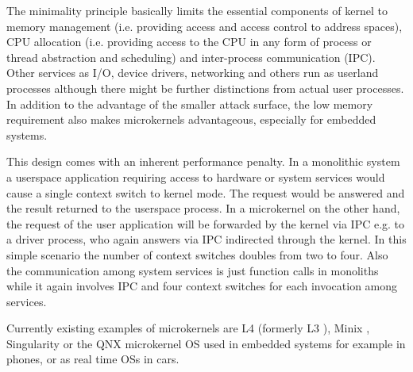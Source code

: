 The minimality principle basically limits the essential components of kernel to memory management (i.e. providing access and access control to address spaces), CPU allocation (i.e. providing access to the CPU in any form of process or thread abstraction and scheduling) and inter-process communication (IPC). Other services as I/O, device drivers, networking and others run as userland processes although there might be further distinctions from actual user processes. In addition to the advantage of the smaller attack surface, the low memory requirement also makes microkernels advantageous, especially for embedded systems. 

This design comes with an inherent performance penalty. In a monolithic system a userspace application requiring access to hardware or system services would cause a single context switch to kernel mode. The request would be answered and the result returned to the userspace process. In a microkernel on the other hand, the request of the user application will be forwarded by the kernel via IPC e.g. to a driver process, who again answers via IPC indirected through the kernel. In this simple scenario the number of context switches doubles from two to four. Also the communication among system services is just function calls in monoliths while it again involves IPC and four context switches for each invocation among services. 

Currently existing examples of microkernels are L4 (formerly L3 \cite{liedtke1993persistent}), Minix \cite{herder2006minix}, Singularity \cite{hunt2005overview} or the QNX microkernel OS\cite{hildebrand1992architectural} used in embedded systems for example in phones, or as real time OSs in cars.

